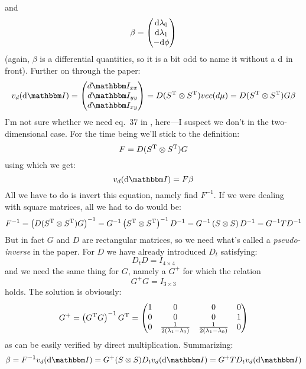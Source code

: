 \documentclass[a4paper,11pt]{article}
\newcommand{\itm}{\mathbbm I}
\newcommand{\itc}[1]{\itm_{#1}}
\newcommand{\diff}{{\rm d}}
\begin{document}
and
\begin{equation}
  \beta =
  \begin{pmatrix}
    \diff\lambda_0\\
    \diff\lambda_1\\
    -\diff\phi
  \end{pmatrix}
\end{equation}
(again, $\beta$ is a differential quantities, so it is a bit odd to name
it without a $\diff$ in front). Further on through the paper:
\begin{equation}
  v_d(\diff\itm) =
  \begin{pmatrix}
    d\itc{xx}\\
    d\itc{yy}\\
    d\itc{xy}
  \end{pmatrix} =
  D (S^{\rm T} \otimes S^{\rm T}) vec(d\mu) =
  D (S^{\rm T} \otimes S^{\rm T}) G\beta
\end{equation}
I'm not sure whether we need eq.~37 in \cite{errors}, here---I suspect we don't
in the two-dimensional case. For the time being we'll stick to the
definition:
\begin{equation}
  F = D (S^{\rm T} \otimes S^{\rm T}) G
\end{equation}
using which we get:
$$
v_d(\diff\itm) = F\beta
$$
All we have to do is invert this equation, namely find $F^{-1}$. If we were
dealing with square matrices, all we had to do would be:
$$
F^{-1} = \left( D (S^{\rm T} \otimes S^{\rm T}) G \right)^{-1} =
G^{-1} \left( S^{\rm T} \otimes S^{\rm T} \right)^{-1} D^{-1} = 
G^{-1} \left( S \otimes S \right) D^{-1} = G^{-1} T D^{-1}
$$
But in fact $G$ and $D$ are rectangular matrices, so we need what's called
a \emph{pseudo-inverse} in the paper. For $D$ we have already introduced
$D_t$ satisfying:
$$
D_tD = I_{4\times4}
$$
and we need the same thing for $G$, namely a $G^+$ for which the relation
$$
G^+G = I_{3\times3}
$$
holds. The solution is obviously:
\begin{equation}
  G^+ = \left( G^{\rm T}G \right)^{-1} G^{\rm T} =
  \begin{pmatrix}
    1 & 0 & 0 & 0\\
    0 & 0 & 0 & 1\\
    0 & \frac{1}{2(\lambda_1-\lambda_0)} & \frac{1}{2(\lambda_1-\lambda_0)} & 0
  \end{pmatrix}
\end{equation}
as can be easily verified by direct multiplication. Summarizing:
\begin{equation}
  \beta = F^{-1}v_d(\diff\itm) = G^+ (S \otimes S) D_t v_d(\diff\itm) =
  G^+ T D_t v_d(\diff\itm)
\end{equation}
\end{document}
